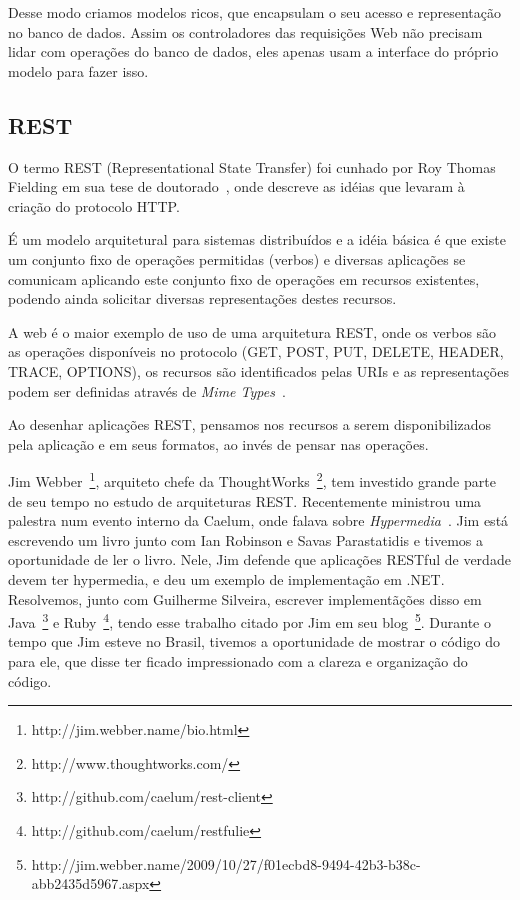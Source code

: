 Desse modo criamos modelos ricos, que encapsulam o seu acesso e representação no banco de dados. Assim os controladores das requisições Web não precisam lidar com operações do banco de dados, eles apenas usam a interface do próprio modelo para fazer isso.

\subsection{REST}
O termo REST (Representational State Transfer) foi cunhado por Roy Thomas Fielding em sua tese de doutorado~\cite{rest-roy}, onde descreve as idéias que levaram à criação do protocolo HTTP.

É um modelo arquitetural para sistemas distribuídos e a idéia básica é que existe um conjunto fixo de operações permitidas (verbos) e diversas aplicações se comunicam aplicando este conjunto fixo de operações em recursos existentes, podendo ainda solicitar diversas representações destes recursos.

A web é o maior exemplo de uso de uma arquitetura REST, onde os verbos são as operações disponíveis no protocolo (GET, POST, PUT, DELETE, HEADER, TRACE, OPTIONS), os recursos são identificados pelas URIs e as representações podem ser definidas através de \textit{Mime Types}~\cite{mimetypes}.

Ao desenhar aplicações REST, pensamos nos recursos a serem disponibilizados pela aplicação e em seus formatos, ao invés de pensar nas operações.

Jim Webber~\footnote{http://jim.webber.name/bio.html}, arquiteto chefe da ThoughtWorks~\footnote{http://www.thoughtworks.com/}, tem investido grande parte de seu tempo no estudo de arquiteturas REST. Recentemente ministrou uma palestra num evento interno da Caelum, onde falava sobre \textit{Hypermedia}~\cite{rest-jim}. Jim está escrevendo um livro junto com Ian Robinson e Savas Parastatidis e tivemos a oportunidade de ler o livro. Nele, Jim defende que aplicações RESTful de verdade devem ter hypermedia, e deu um exemplo de implementação em .NET. Resolvemos, junto com Guilherme Silveira, escrever implementãções disso em Java~\footnote{http://github.com/caelum/rest-client} e Ruby~\footnote{http://github.com/caelum/restfulie}, tendo esse trabalho citado por Jim em seu blog~\footnote{http://jim.webber.name/2009/10/27/f01ecbd8-9494-42b3-b38c-abb2435d5967.aspx}. Durante o tempo que Jim esteve no Brasil, tivemos a oportunidade de mostrar o código do \calopsita para ele, que disse ter ficado impressionado com a clareza e organização do código.


